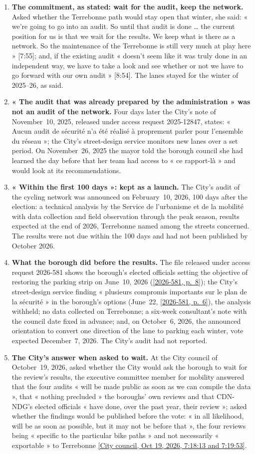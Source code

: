 \documentclass[11pt,letterpaper]{article}
\newcommand{\repourl}{https://github.com/OpenMobilityData/Terrebonne-open-sources}
\newcommand{\pagesurl}{https://openmobilitydata.github.io/Terrebonne-access-requests}
\newcommand{\cliptime}[1]{\textsf{\small[#1]}}
\newcommand{\pgl}[2]{\href{\pagesurl/2026-581/raw/01_emails_mandate_counts.pdf\#page=#1}{\textsf{\small[2026-581, p.~#2]}}}
\newcommand{\pg}[1]{\pgl{#1}{#1}}
\newcommand{\tr}[1]{\href{\repourl/blob/main/2026-10-19-city-council/2026-10-19_03.md}{\textsf{\small[City council, Oct 19, 2026, #1]}}}
\begin{document}
\begin{enumerate}[nosep]
\item \textbf{The commitment, as stated: wait for the audit, keep the network.} Asked whether the Terrebonne path would stay open that winter, she said: « we're going to go into an audit. So until that audit is done … the current position for us is that we wait for the results. We keep what is there as a network. So the maintenance of the Terrebonne is still very much at play here » \cliptime{7:55}; and, if the existing audit « doesn't seem like it was truly done in an independent way, we have to take a look and see whether or not we have to go forward with our own audit » \cliptime{8:54}. The lanes stayed for the winter of 2025--26, as said.
\item \textbf{« The audit that was already prepared by the administration » was not an audit of the network.} Four days later the City's note of November~10, 2025, released under access request 2025-12847, states: « Aucun audit de sécurité n'a été réalisé à proprement parler pour l'ensemble du réseau »; the City's street-design service monitors new lanes over a set period. On November~26, 2025 the mayor told the borough council she had learned the day before that her team had access to « ce rapport-là » and would look at its recommendations.
\item \textbf{« Within the first 100 days »: kept as a launch.} The City's audit of the cycling network was announced on February~10, 2026, 100 days after the election: a technical analysis by the Service de l'urbanisme et de la mobilité with data collection and field observation through the peak season, results expected at the end of 2026, Terrebonne named among the streets concerned. The results were not due within the 100 days and had not been published by October 2026.
\item \textbf{What the borough did before the results.} The file released under access request 2026-581 shows the borough's elected officials setting the objective of restoring the parking strip on June~10, 2026 (\pg{8}); the City's street-design service finding « plusieurs compromis importants sur le plan de la sécurité » in the borough's options (June~22, \pg{6}), the analysis withheld; no data collected on Terrebonne; a six-week consultant's note with the council date fixed in advance; and, on October~6, 2026, the announced orientation to convert one direction of the lane to parking each winter, vote expected December~7, 2026. The City's audit had not reported.
\item \textbf{The City's answer when asked to wait.} At the City council of October~19, 2026, asked whether the City would ask the borough to wait for the review's results, the executive committee member for mobility answered that the four audits « will be made public as soon as we can compile the data », that « nothing precluded » the boroughs' own reviews and that CDN-NDG's elected officials « have done, over the past year, their review »; asked whether the findings would be published before the vote: « in all likelihood, will be as soon as possible, but it may not be before that », the four reviews being « specific to the particular bike paths » and not necessarily « exportable » to Terrebonne \tr{7:18:13 and 7:19:53}.

\end{enumerate}
\end{document}

